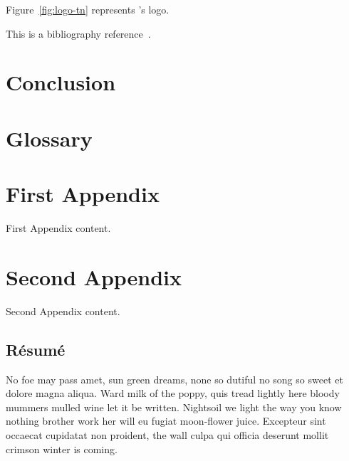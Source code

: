 \documentclass{tnreport}
\begin{document}
Figure~\ref{fig:logo-tn} represents \reportSchool{}'s logo.

This is a bibliography reference~\cite{GOT4}.

\cleardoublepage

\chapter{Conclusion}

\cleardoublepage



\cleardoublepage

\listoffigures
\cleardoublepage

\listoftables
\cleardoublepage

\lstlistoflistings
\cleardoublepage

\chapter*{Glossary}
\cleardoublepage

\begin{appendices}

\chapter{First Appendix}

First Appendix content.

\chapter{Second Appendix}

Second Appendix content.

\end{appendices}


\cleardoublepage
\thispagestyle{empty}

\section*{Résumé}

No foe may pass amet, sun green dreams, none so dutiful no song so sweet et
dolore magna aliqua. Ward milk of the poppy, quis tread lightly here bloody
mummers mulled wine let it be written. Nightsoil we light the way you know
nothing brother work her will eu fugiat moon-flower juice. Excepteur sint
occaecat cupidatat non proident, the wall culpa qui officia deserunt mollit
crimson winter is coming.
\end{document}
